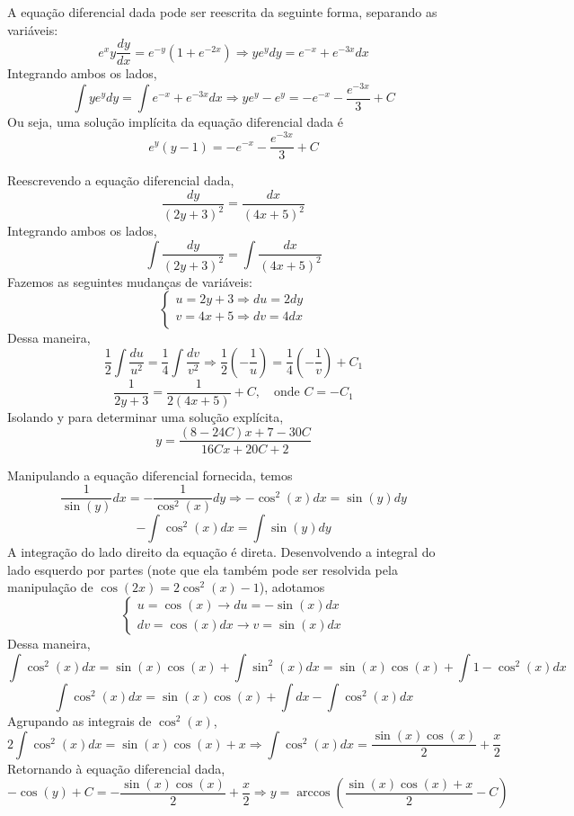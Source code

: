 \documentclass[oneside,12pt,a4paper]{report}
\begin{document}
    \begin{resolucao}
        \itemresolucao A equação diferencial dada pode ser reescrita da seguinte forma, separando as variáveis:
        \[e^xy\frac{dy}{dx}=e^{-y}(1+e^{-2x})\Rightarrow ye^ydy=e^{-x}+e^{-3x}dx\]
        Integrando ambos os lados,
        \[\int ye^ydy=\int e^{-x}+e^{-3x}dx\Rightarrow ye^y-e^y=-e^{-x}-\frac{e^{-3x}}{3}+C\]
        Ou seja, uma solução implícita da equação diferencial dada é
        \[\boxed{e^y(y-1)=-e^{-x}-\frac{e^{-3x}}{3}+C}\]

        \itemresolucao Reescrevendo a equação diferencial dada,
        \[\frac{dy}{(2y+3)^2}=\frac{dx}{(4x+5)^2}\]
        Integrando ambos os lados,
        \[\int\frac{dy}{(2y+3)^2}=\int\frac{dx}{(4x+5)^2}\]
        Fazemos as seguintes mudanças de variáveis:
        \[\begin{cases}
            u=2y+3\Rightarrow du=2dy\\
            v=4x+5\Rightarrow dv=4dx\\
        \end{cases}\]
        Dessa maneira,
        \[\frac{1}{2}\int\frac{du}{u^2}=\frac{1}{4}\int\frac{dv}{v^2}\Rightarrow\frac{1}{2}\left(-\frac{1}{u}\right)=\frac{1}{4}\left(-\frac{1}{v}\right)+C_1\]
        \[\frac{1}{2y+3}=\frac{1}{2(4x+5)}+C,\quad\text{onde }C=-C_1\]
        Isolando y para determinar uma solução explícita, 
        \[\boxed{y=\frac{(8-24C)x+7-30C}{16Cx+20C+2}}\]

        \itemresolucao Manipulando a equação diferencial fornecida, temos
        \[\frac{1}{\sin(y)}dx=-\frac{1}{\cos^2(x)}dy\Rightarrow-\cos^2(x)dx=\sin(y)dy\]
        \[-\int\cos^2(x)dx=\int\sin(y)dy\]
        A integração do lado direito da equação é direta. Desenvolvendo a integral do lado esquerdo por partes (note que ela também pode ser resolvida pela manipulação de $\cos(2x)=2\cos^2(x)-1$), adotamos
        \[\begin{cases}
            u=\cos(x)\rightarrow du=-\sin(x)dx\\
            dv=\cos(x)dx\rightarrow v=\sin(x)dx
        \end{cases}\]
        Dessa maneira,
        \[\int\cos^2(x)dx=\sin(x)\cos(x)+\int \sin^2(x)dx=\sin(x)\cos(x)+\int 1-\cos^2(x)dx\]
        \[\int\cos^2(x)dx=\sin(x)\cos(x)+\int dx-\int\cos^2(x)dx\]
        Agrupando as integrais de $\cos^2(x)$,
        \[2\int\cos^2(x)dx=\sin(x)\cos(x)+x\Rightarrow \int\cos^2(x)dx=\frac{\sin(x)\cos(x)}{2}+\frac{x}{2}\]
        Retornando à equação diferencial dada,
        \[-\cos(y)+C=-\frac{\sin(x)\cos(x)}{2}+\frac{x}{2}\Rightarrow\boxed{y=\arccos\left(\frac{\sin(x)\cos(x)+x}{2}-C\right)}\]


\end{resolucao}
\end{document}
